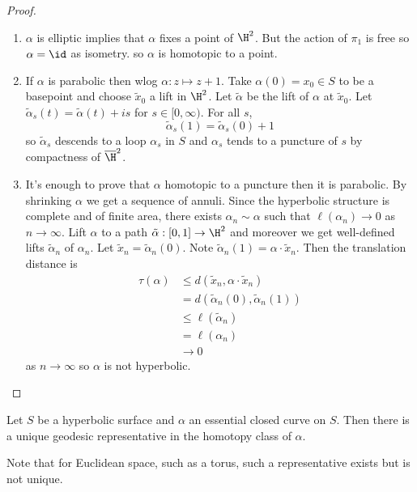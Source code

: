 \documentclass[a4paper]{article}
\begin{document}
\begin{proof}\leavevmode
  \begin{enumerate}
  \item \(\alpha\) is elliptic implies that \(\alpha\) fixes a point of \(\H^2\). But the action of \(\pi_1\) is free so \(\alpha = \id\) as isometry. so \(\alpha\) is homotopic to a point.
  \item If \(\alpha\) is parabolic then wlog \(\alpha: z \mapsto z + 1\). Take \(\alpha(0) = x_0 \in S\) to be a basepoint and choose \(\tilde x_0\) a lift in \(\H^2\). Let \(\tilde \alpha\) be the lift of \(\alpha\) at \(\tilde x_0\). Let \(\tilde \alpha_s(t) = \tilde \alpha(t) + is\) for \(s \in [0, \infty)\). For all \(s\),
    \[
      \tilde \alpha_s(1) = \tilde \alpha_s(0) + 1
    \]
    so \(\tilde \alpha_s\) descends to a loop \(\alpha_s\) in \(S\) and \(\alpha_s\) tends to a puncture of \(s\) by compactness of \(\overline \H^2\).
  \item It's enough to prove that \(\alpha\) homotopic to a puncture then it is parabolic. By shrinking \(\alpha\) we get a sequence of annuli. Since the hyperbolic structure is complete and of finite area, there exists \(\alpha_n \sim \alpha\) such that \(\ell(\alpha_n) \to 0\) as \(n \to \infty\). Lift \(\alpha\) to a path \(\tilde \alpha: [0, 1] \to \H^2\) and moreover we get well-defined lifts \(\tilde \alpha_n\) of \(\alpha_n\). Let \(\tilde x_n = \tilde \alpha_n(0)\). Note \(\tilde \alpha_n(1) = \alpha \cdot \tilde x_n\). Then the translation distance is
    \begin{align*}
      \tau(\alpha)
      &\leq d(\tilde x_n, \alpha \cdot \tilde x_n) \\
      &= d(\tilde \alpha_n(0), \tilde \alpha_n(1)) \\
      &\leq \ell(\tilde \alpha_n) \\
      &= \ell(\alpha_n) \\
      &\to 0
    \end{align*}
    as \(n \to \infty\) so \(\alpha\) is not hyperbolic.
  \end{enumerate}
\end{proof}

\begin{lemma}
  Let \(S\) be a hyperbolic surface and \(\alpha\) an essential closed curve on \(S\). Then there is a unique geodesic representative in the homotopy class of \(\alpha\).
\end{lemma}

Note that for Euclidean space, such as a torus, such a representative exists but is not unique.
\end{document}
